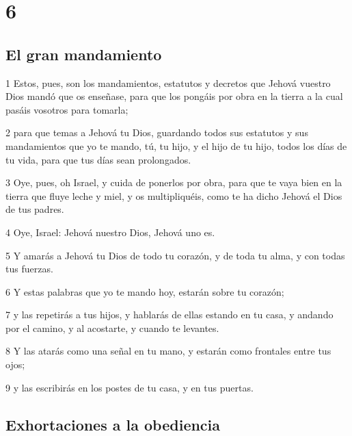\chapter{6}

\section{El gran mandamiento}

\par 1 Estos, pues, son los mandamientos, estatutos y decretos que Jehová vuestro Dios mandó que os enseñase, para que los pongáis por obra en la tierra a la cual pasáis vosotros para tomarla;
\par 2 para que temas a Jehová tu Dios, guardando todos sus estatutos y sus mandamientos que yo te mando, tú, tu hijo, y el hijo de tu hijo, todos los días de tu vida, para que tus días sean prolongados.
\par 3 Oye, pues, oh Israel, y cuida de ponerlos por obra, para que te vaya bien en la tierra que fluye leche y miel, y os multipliquéis, como te ha dicho Jehová el Dios de tus padres.
\par 4 Oye, Israel: Jehová nuestro Dios, Jehová uno es.
\par 5 Y amarás a Jehová tu Dios de todo tu corazón, y de toda tu alma, y con todas tus fuerzas.
\par 6 Y estas palabras que yo te mando hoy, estarán sobre tu corazón;
\par 7 y las repetirás a tus hijos, y hablarás de ellas estando en tu casa, y andando por el camino, y al acostarte, y cuando te levantes.
\par 8 Y las atarás como una señal en tu mano, y estarán como frontales entre tus ojos;
\par 9 y las escribirás en los postes de tu casa, y en tus puertas.

\section{Exhortaciones a la obediencia}


